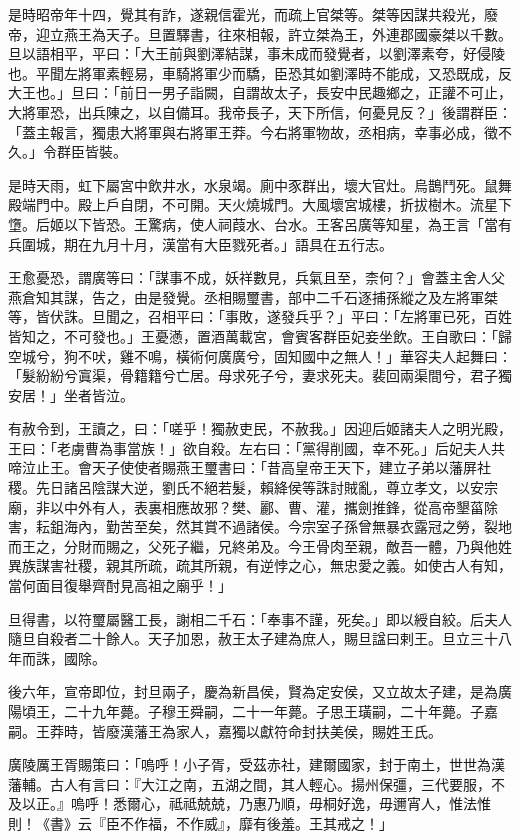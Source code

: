 \begin{pinyinscope}
是時昭帝年十四，覺其有詐，遂親信霍光，而疏上官桀等。桀等因謀共殺光，廢帝，迎立燕王為天子。旦置驛書，往來相報，許立桀為王，外連郡國豪桀以千數。旦以語相平，平曰：「大王前與劉澤結謀，事未成而發覺者，以劉澤素夸，好侵陵也。平聞左將軍素輕易，車騎將軍少而驕，臣恐其如劉澤時不能成，又恐既成，反大王也。」旦曰：「前日一男子詣闕，自謂故太子，長安中民趣鄉之，正讙不可止，大將軍恐，出兵陳之，以自備耳。我帝長子，天下所信，何憂見反？」後謂群臣：「蓋主報言，獨患大將軍與右將軍王莽。今右將軍物故，丞相病，幸事必成，徵不久。」令群臣皆裝。

是時天雨，虹下屬宮中飲井水，水泉竭。廁中豕群出，壞大官灶。烏鵲鬥死。鼠舞殿端門中。殿上戶自閉，不可開。天火燒城門。大風壞宮城樓，折拔樹木。流星下墯。后姬以下皆恐。王驚病，使人祠葭水、台水。王客呂廣等知星，為王言「當有兵圍城，期在九月十月，漢當有大臣戮死者。」語具在五行志。

王愈憂恐，謂廣等曰：「謀事不成，妖祥數見，兵氣且至，柰何？」會蓋主舍人父燕倉知其謀，告之，由是發覺。丞相賜璽書，部中二千石逐捕孫縱之及左將軍桀等，皆伏誅。旦聞之，召相平曰：「事敗，遂發兵乎？」平曰：「左將軍已死，百姓皆知之，不可發也。」王憂懣，置酒萬載宮，會賓客群臣妃妾坐飲。王自歌曰：「歸空城兮，狗不吠，雞不鳴，橫術何廣廣兮，固知國中之無人！」華容夫人起舞曰：「髮紛紛兮寘渠，骨籍籍兮亡居。母求死子兮，妻求死夫。裴回兩渠間兮，君子獨安居！」坐者皆泣。

有赦令到，王讀之，曰：「嗟乎！獨赦吏民，不赦我。」因迎后姬諸夫人之明光殿，王曰：「老虜曹為事當族！」欲自殺。左右曰：「黨得削國，幸不死。」后妃夫人共啼泣止王。會天子使使者賜燕王璽書曰：「昔高皇帝王天下，建立子弟以藩屏社稷。先日諸呂陰謀大逆，劉氏不絕若髮，賴絳侯等誅討賊亂，尊立孝文，以安宗廟，非以中外有人，表裏相應故邪？樊、酈、曹、灌，攜劍推鋒，從高帝墾菑除害，耘鉏海內，勤苦至矣，然其賞不過諸侯。今宗室子孫曾無暴衣露冠之勞，裂地而王之，分財而賜之，父死子繼，兄終弟及。今王骨肉至親，敵吾一體，乃與他姓異族謀害社稷，親其所疏，疏其所親，有逆悖之心，無忠愛之義。如使古人有知，當何面目復舉齊酎見高祖之廟乎！」

旦得書，以符璽屬醫工長，謝相二千石：「奉事不謹，死矣。」即以綬自絞。后夫人隨旦自殺者二十餘人。天子加恩，赦王太子建為庶人，賜旦諡曰剌王。旦立三十八年而誅，國除。

後六年，宣帝即位，封旦兩子，慶為新昌侯，賢為定安侯，又立故太子建，是為廣陽頃王，二十九年薨。子穆王舜嗣，二十一年薨。子思王璜嗣，二十年薨。子嘉嗣。王莽時，皆廢漢藩王為家人，嘉獨以獻符命封扶美侯，賜姓王氏。

廣陵厲王胥賜策曰：「嗚呼！小子胥，受茲赤社，建爾國家，封于南土，世世為漢藩輔。古人有言曰：『大江之南，五湖之間，其人輕心。揚州保彊，三代要服，不及以正。』嗚呼！悉爾心，祗祗兢兢，乃惠乃順，毋桐好逸，毋邇宵人，惟法惟則！《書》云『臣不作福，不作威』，靡有後羞。王其戒之！」


\end{pinyinscope}
